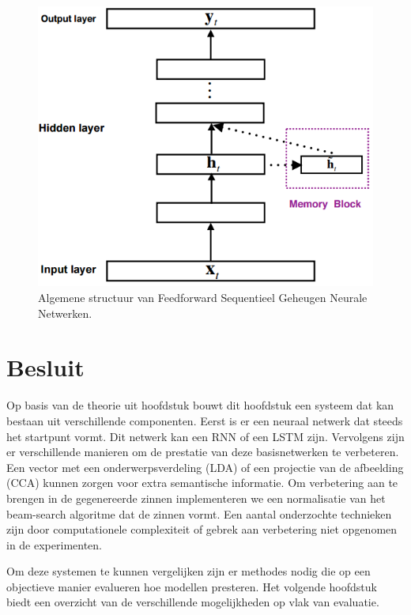 \begin{figure}[tb]
	\centering
	\includegraphics[width=0.6\linewidth]{Images/FSMN}
	\caption{Algemene structuur van Feedforward Sequentieel Geheugen Neurale Netwerken.}
	\label{fig:fsmn}
\end{figure}

\section{Besluit}
Op basis van de theorie uit hoofdstuk  bouwt dit hoofdstuk een systeem dat kan bestaan uit verschillende componenten.  Eerst is er een neuraal netwerk dat steeds het startpunt vormt. Dit netwerk kan een RNN of een LSTM zijn. Vervolgens zijn er verschillende manieren om de prestatie van deze basisnetwerken te verbeteren.  Een vector met een onderwerpsverdeling (LDA) of een projectie van de afbeelding (CCA) kunnen zorgen voor extra semantische informatie. Om verbetering aan te brengen in de gegenereerde zinnen implementeren we een normalisatie van het beam-search algoritme dat de zinnen vormt. Een aantal onderzochte technieken zijn door computationele complexiteit of gebrek aan verbetering niet opgenomen in de experimenten. 

Om deze systemen te kunnen vergelijken zijn er methodes nodig die op een objectieve manier evalueren hoe modellen presteren. Het volgende hoofdstuk biedt een overzicht van de verschillende mogelijkheden op vlak van evaluatie.